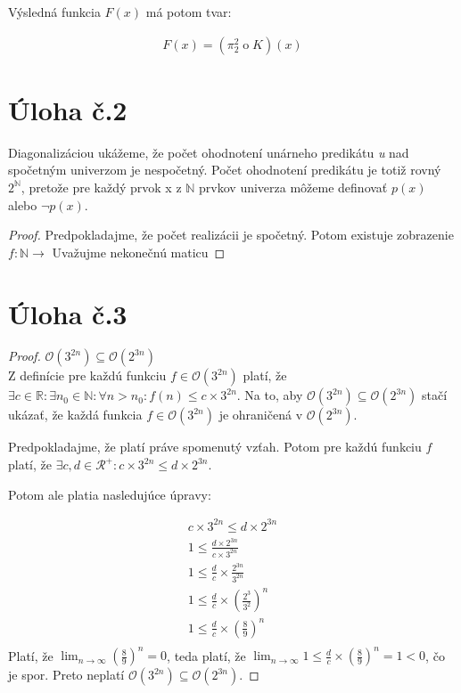 \documentclass[10pt]{article}
\begin{document}
Výsledná funkcia $F(x)$ má potom tvar:

\begin{align*}
    F(x) = (\pi_2^2 \mathbin{o} K) (x)
\end{align*}

\section*{Úloha č.2}
Diagonalizáciou ukážeme, že počet ohodnotení unárneho predikátu \textit{u} nad spočetným univerzom je nespočetný. Počet ohodnotení predikátu je totiž rovný $2^{\mathbb{N}}$, pretože pre každý prvok x z $\mathbb{N}$ prvkov univerza môžeme definovať $p(x)$ alebo $\neg p(x)$.

\begin{proof}
    Predpokladajme, že počet realizácii je spočetný. Potom existuje zobrazenie $f: \mathbb{N} \to$ 
    Uvažujme nekonečnú maticu
\end{proof}
\section*{Úloha č.3}

\begin{proof}
$\mathcal{O}(3^{2n}) \subseteq \mathcal{O}(2^{3n})$ \\
Z definície pre každú funkciu $f \in \mathcal{O}(3^{2n})$ platí, že $\exists c \in \mathbb{R}: \exists n_0 \in \mathbb{N}: \forall n > n_0: f(n) \leq c\times 3^{2n}$.  
Na to, aby $\mathcal{O}(3^{2n}) \subseteq \mathcal{O}(2^{3n})$ stačí ukázať, že každá funkcia $f \in \mathcal{O}(3^{2n})$ je ohraničená v $\mathcal{O}(2^{3n})$.

Predpokladajme, že platí práve spomenutý vzťah. Potom pre každú funkciu $f$ platí, že $\exists c,d \in \mathcal{R}^+: c \times 3^{2n} \leq d \times 2^{3n}$. 

Potom ale platia nasledujúce úpravy:

\begin{align*}
    c \times 3^{2n} \leq d \times 2^{3n}  \\
    1 \leq \frac{d \times 2^{3n}}{c \times 3^{2n}} \\
    1 \leq \frac{d}{c} \times \frac{2^{3n}}{3^{2n}} \\
    1 \leq \frac{d}{c} \times (\frac{2^{3}}{3^{2}})^n \\
    1 \leq \frac{d}{c} \times (\frac{8}{9})^n \\
\end{align*}
Platí, že $\lim_{n \to \infty} (\frac{8}{9})^n = 0$, teda platí, že $\lim_{n \to \infty} 1 \leq \frac{d}{c} \times (\frac{8}{9})^n  = 1 < 0$, čo je spor.
Preto neplatí $\mathcal{O}(3^{2n}) \subseteq \mathcal{O}(2^{3n})$.
\end{proof}
\end{document}
